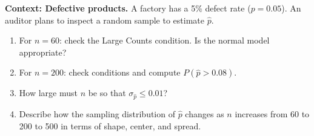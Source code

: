 \documentclass[10pt]{article}
\begin{document}
\vspace{0.12in}

\begin{tcolorbox}[colback=redbg, colframe=black!40, boxrule=0.6pt, arc=2mm,
    left=3mm, right=3mm, top=2mm, bottom=2mm, title=\textbf{Tier E --- Extension}]
\textbf{Context: Defective products.}
A factory has a 5\% defect rate ($p = 0.05$). An auditor plans to inspect a random
sample to estimate $\hat{p}$.

\begin{enumerate}
  \item For $n = 60$: check the Large Counts condition. Is the normal model appropriate?
  \item For $n = 200$: check conditions and compute $P(\hat{p} > 0.08)$.
        \vspace{0.9in}
  \item How large must $n$ be so that $\sigma_{\hat{p}} \le 0.01$?
        \vspace{0.7in}
  \item Describe how the sampling distribution of $\hat{p}$ changes as $n$ increases from
        60 to 200 to 500 in terms of shape, center, and spread.
\end{enumerate}
\end{tcolorbox}
\end{document}
